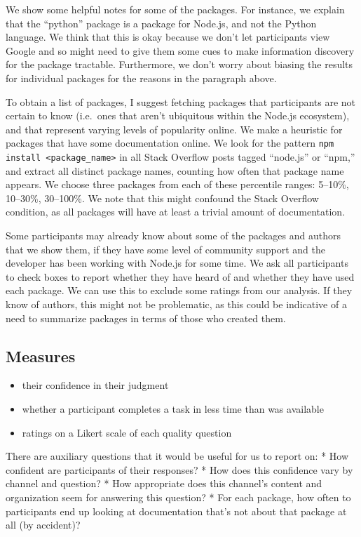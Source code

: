 We show some helpful notes for some of the packages.
For instance, we explain that the ``python'' package is a package for Node.js, and not the Python language.
We think that this is okay because we don't let participants view Google and so might need to give them some cues to make information discovery for the package tractable.
Furthermore, we don't worry about biasing the results for individual packages for the reasons in the paragraph above.
\fi

To obtain a list of packages, I suggest fetching packages that participants are not certain to know (i.e.\ ones that aren't ubiquitous within the Node.js ecosystem), and that represent varying levels of popularity online.
We make a heuristic for packages that have some documentation online.
We look for the pattern \texttt{npm install <package\_name>} in all Stack Overflow posts tagged ``node.js'' or ``npm,'' and extract all distinct package names, counting how often that package name appears.
We choose three packages from each of these percentile ranges: 5--10\%, 10--30\%, 30--100\%.
We note that this might confound the Stack Overflow condition, as all packages will have at least a trivial amount of documentation.

Some participants may already know about some of the packages and authors that we show them, if they have some level of community support and the developer has been working with Node.js for some time.
We ask all participants to check boxes to report whether they have heard of and whether they have used each package.
 We can use this to exclude some ratings from our analysis.
 If they know of authors, this might not be problematic, as this could be indicative of a need to summarize packages in terms of those who created them.
\fi
{}
\subsection{Measures}

\begin{itemize}
\item their confidence in their judgment
\item whether a participant completes a task in less time than was available 
\item ratings on a Likert scale of each quality question
\end{itemize}

There are auxiliary questions that it would be useful for us to report on:
* How confident are participants of their responses?
* How does this confidence vary by channel and question?
* How appropriate does this channel's content and organization seem for answering this question?
* For each package, how often to participants end up looking at documentation that's not about that package at all (by accident)?

